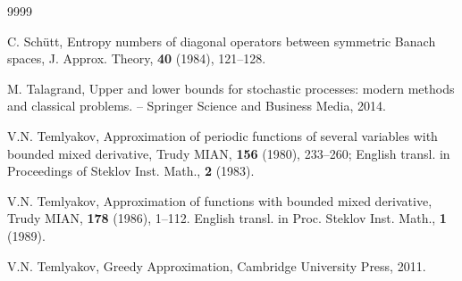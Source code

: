 \documentclass[12pt]{article}
\numberwithin{equation}{section}
\begin{document}
\begin{thebibliography}{9999}

 C. Sch{\" u}tt, Entropy numbers of diagonal operators between
symmetric Banach spaces,
 J. Approx. Theory, {\bf 40} (1984), 121--128.
 
 
  M. Talagrand, Upper and lower bounds for stochastic processes: modern methods and classical problems.
-- Springer Science and Business Media, 2014.

   V.N. Temlyakov,  Approximation of periodic functions
of several variables with bounded mixed derivative, Trudy MIAN, {\bf 156}
(1980), 233--260; English transl. in Proceedings of Steklov Inst. Math., {\bf 2}
(1983).



 V.N. Temlyakov, Approximation of functions with bounded mixed derivative, Trudy MIAN, {\bf 178} (1986), 1--112. English transl. in Proc. Steklov Inst. Math., {\bf 1} (1989).





 V.N. Temlyakov, Greedy Approximation, Cambridge University
Press, 2011.




\end{thebibliography}
\end{document}
